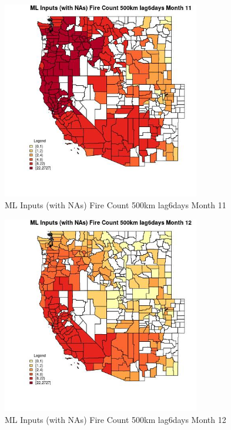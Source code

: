 \begin{figure} 
\centering  
\includegraphics[width=0.77\textwidth]{Code_Outputs/Report_ML_input_PM25_Step4_part_f_de_duplicated_aveswNAs_CountyFire_Count_500km_lag6daysmedianMonth11.jpg} 
\caption{\label{fig:Report_ML_input_PM25_Step4_part_f_de_duplicated_aveswNAsCountyFire_Count_500km_lag6daysmedianMonth11}ML Inputs (with NAs) Fire Count 500km lag6days Month 11} 
\end{figure} 
 

\begin{figure} 
\centering  
\includegraphics[width=0.77\textwidth]{Code_Outputs/Report_ML_input_PM25_Step4_part_f_de_duplicated_aveswNAs_CountyFire_Count_500km_lag6daysmedianMonth12.jpg} 
\caption{\label{fig:Report_ML_input_PM25_Step4_part_f_de_duplicated_aveswNAsCountyFire_Count_500km_lag6daysmedianMonth12}ML Inputs (with NAs) Fire Count 500km lag6days Month 12} 
\end{figure} 
 

